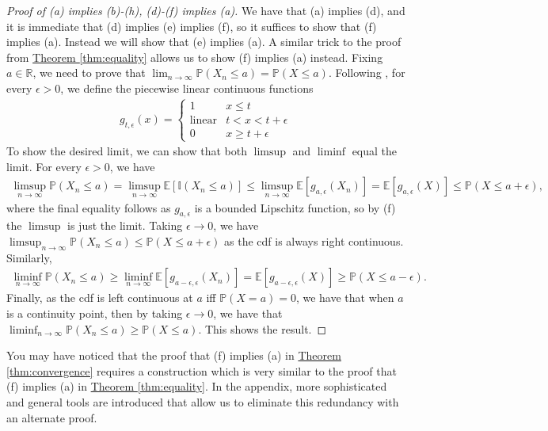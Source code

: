 \documentclass{article}
\theoremstyle{definition}
\renewcommand{\P}{\mathbb P}
\newcommand{\E}{\mathbb E}
\newcommand{\1}{\mathbb I}
\newcommand{\R}{\mathbb R}
\newcommand{\thmhref}[1]{\hyperref[#1]{Theorem \ref{#1}}}
\begin{document}
\begin{proof}[Proof of (a) implies (b)-(h), (d)-(f) implies (a)]
  We have that (a) implies (d), and it is immediate that (d) implies
  (e) implies (f), so it suffices to show that (f) implies (a).
  Instead we will show that (e) implies (a).  A similar trick to the
  proof from \thmhref{thm:equality} allows us to show (f) implies (a)
  instead.  Fixing $a \in \R$, we need to prove that $\lim_{n \to
    \infty} \P(X_n \leq a) = \P(X \leq a)$.  Following
  \cite{durrett2010probability}, for every $\epsilon > 0$, we define
  the piecewise linear continuous functions
  \begin{align*}
    g_{t,\epsilon}(x) =
    \begin{cases}
      1 & x \leq t\\
      \text{linear} &t < x < t + \epsilon\\
      0 & x \geq t + \epsilon
    \end{cases}
  \end{align*}
  To show the desired limit, we can show that both $\limsup$ and
  $\liminf$ equal the limit.  For every $\epsilon > 0$, we have
  \begin{align*}
    \limsup_{n \to \infty} \P(X_n \leq a) = \limsup_{n \to \infty} \E[\1(X_n \leq a)] \leq  \limsup_{n \to \infty} \E[g_{a,\epsilon}(X_n)] = \E[g_{a,\epsilon}(X)] \leq \P(X \leq a + \epsilon),
  \end{align*}
  where the final equality follows as $g_{a,\epsilon}$ is a bounded
  Lipschitz function, so by (f) the $\limsup$ is just the
  limit. Taking $\epsilon \to 0$, we have $\limsup_{n \to \infty}
  \P(X_n \leq a) \leq \P(X \leq a + \epsilon)$ as the cdf is always right continuous.  Similarly,
  \begin{align*}
    \liminf_{n \to \infty} \P(X_n \leq a) \geq \liminf_{n \to \infty} \E[g_{a-\epsilon,\epsilon}(X_n)] = \E[g_{a-\epsilon,\epsilon}(X)] \geq \P(X \leq a - \epsilon).
  \end{align*}
  Finally, as the cdf is left continuous at $a$ iff $\P(X = a) =0$, we
  have that when $a$ is a continuity point, then by taking $\epsilon
  \to 0$, we have that $\liminf_{n \to \infty} \P(X_n \leq a) \geq
  \P(X \leq a)$.  This shows the result.
\end{proof}
You may have noticed that the proof that (f) implies (a) in
\thmhref{thm:convergence} requires a construction which is very
similar to the proof that (f) implies (a) in \thmhref{thm:equality}.
In the appendix, more sophisticated and general tools are introduced
that allow us to eliminate this redundancy with an alternate proof.
\end{document}
